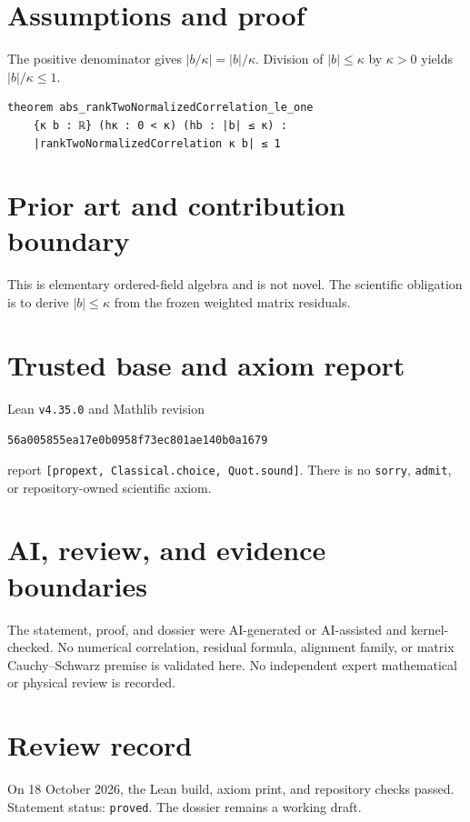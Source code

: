 \documentclass[11pt]{article}
\begin{document}
\section{Assumptions and proof}
The positive denominator gives $|b/\kappa|=|b|/\kappa$. Division of
$|b|\le\kappa$ by $\kappa>0$ yields $|b|/\kappa\le1$.

\begin{lstlisting}
theorem abs_rankTwoNormalizedCorrelation_le_one
    {κ b : ℝ} (hκ : 0 < κ) (hb : |b| ≤ κ) :
    |rankTwoNormalizedCorrelation κ b| ≤ 1
\end{lstlisting}

\section{Prior art and contribution boundary}
This is elementary ordered-field algebra and is not novel. The scientific obligation is
to derive $|b|\le\kappa$ from the frozen weighted matrix residuals.

\section{Trusted base and axiom report}
Lean \texttt{v4.35.0} and Mathlib revision
\begin{center}\texttt{56a005855ea17e0b0958f73ec801ae140b0a1679}\end{center}
report \texttt{[propext, Classical.choice, Quot.sound]}. There is no \texttt{sorry},
\texttt{admit}, or repository-owned scientific axiom.

\section{AI, review, and evidence boundaries}
The statement, proof, and dossier were AI-generated or AI-assisted and kernel-checked.
No numerical correlation, residual formula, alignment family, or matrix Cauchy--Schwarz
premise is validated here. No independent expert mathematical or physical review is
recorded.

\section{Review record}
On 18 October 2026, the Lean build, axiom print, and repository checks passed. Statement
status: \texttt{proved}. The dossier remains a working draft.
\end{document}
